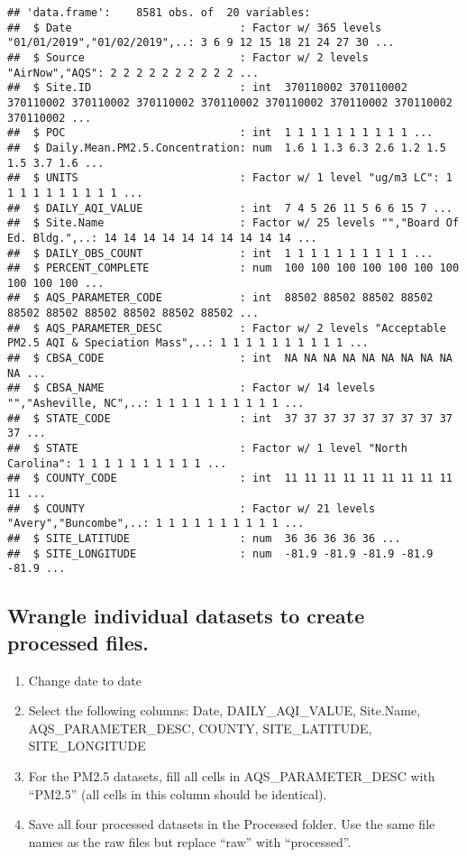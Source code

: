 \documentclass[]{article}
\providecommand{\tightlist}{%
  \setlength{\itemsep}{0pt}\setlength{\parskip}{0pt}}
\begin{document}
\begin{verbatim}
## 'data.frame':    8581 obs. of  20 variables:
##  $ Date                          : Factor w/ 365 levels "01/01/2019","01/02/2019",..: 3 6 9 12 15 18 21 24 27 30 ...
##  $ Source                        : Factor w/ 2 levels "AirNow","AQS": 2 2 2 2 2 2 2 2 2 2 ...
##  $ Site.ID                       : int  370110002 370110002 370110002 370110002 370110002 370110002 370110002 370110002 370110002 370110002 ...
##  $ POC                           : int  1 1 1 1 1 1 1 1 1 1 ...
##  $ Daily.Mean.PM2.5.Concentration: num  1.6 1 1.3 6.3 2.6 1.2 1.5 1.5 3.7 1.6 ...
##  $ UNITS                         : Factor w/ 1 level "ug/m3 LC": 1 1 1 1 1 1 1 1 1 1 ...
##  $ DAILY_AQI_VALUE               : int  7 4 5 26 11 5 6 6 15 7 ...
##  $ Site.Name                     : Factor w/ 25 levels "","Board Of Ed. Bldg.",..: 14 14 14 14 14 14 14 14 14 14 ...
##  $ DAILY_OBS_COUNT               : int  1 1 1 1 1 1 1 1 1 1 ...
##  $ PERCENT_COMPLETE              : num  100 100 100 100 100 100 100 100 100 100 ...
##  $ AQS_PARAMETER_CODE            : int  88502 88502 88502 88502 88502 88502 88502 88502 88502 88502 ...
##  $ AQS_PARAMETER_DESC            : Factor w/ 2 levels "Acceptable PM2.5 AQI & Speciation Mass",..: 1 1 1 1 1 1 1 1 1 1 ...
##  $ CBSA_CODE                     : int  NA NA NA NA NA NA NA NA NA NA ...
##  $ CBSA_NAME                     : Factor w/ 14 levels "","Asheville, NC",..: 1 1 1 1 1 1 1 1 1 1 ...
##  $ STATE_CODE                    : int  37 37 37 37 37 37 37 37 37 37 ...
##  $ STATE                         : Factor w/ 1 level "North Carolina": 1 1 1 1 1 1 1 1 1 1 ...
##  $ COUNTY_CODE                   : int  11 11 11 11 11 11 11 11 11 11 ...
##  $ COUNTY                        : Factor w/ 21 levels "Avery","Buncombe",..: 1 1 1 1 1 1 1 1 1 1 ...
##  $ SITE_LATITUDE                 : num  36 36 36 36 36 ...
##  $ SITE_LONGITUDE                : num  -81.9 -81.9 -81.9 -81.9 -81.9 ...
\end{verbatim}

\subsection{Wrangle individual datasets to create processed
files.}\label{wrangle-individual-datasets-to-create-processed-files.}

\begin{enumerate}
\def\labelenumi{\arabic{enumi}.}
\setcounter{enumi}{2}
\tightlist
\item
  Change date to date
\item
  Select the following columns: Date, DAILY\_AQI\_VALUE, Site.Name,
  AQS\_PARAMETER\_DESC, COUNTY, SITE\_LATITUDE, SITE\_LONGITUDE
\item
  For the PM2.5 datasets, fill all cells in AQS\_PARAMETER\_DESC with
  ``PM2.5'' (all cells in this column should be identical).
\item
  Save all four processed datasets in the Processed folder. Use the same
  file names as the raw files but replace ``raw'' with ``processed''.
\end{enumerate}
\end{document}
